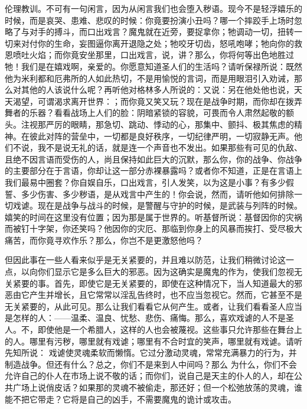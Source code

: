 伦理教训。不可有一句闲言，因为从闲言我们也会堕入秽语。现今不是轻浮嬉乐的时候，而是哀哭、患难、悲叹的时候：你竟要扮演小丑吗？哪一个摔跤手上场时忽略了与对手的搏斗，而口出戏言？魔鬼就在近旁，要捉拿你；牠调动一切，扭转一切来对付你的生命，妄图逼你离开退隐之处；牠咬牙切齿，怒吼咆哮；牠向你的救恩喷吐火焰；而你竟安坐那里，口出戏言，说，讲？那么，你将何等出色地胜过牠！我们是在嬉戏啊，亲爱的。你愿意知道圣人们的生活吗？请听保禄所说：既然他为米利都和厄弗所的人如此热切，不是用愉悦的言词，而是用眼泪引入劝诫，那么对其他的人该说什么呢？再听他对格林多人所说的：又说：另在他处他也说，天天渴望，可谓渴求离开世界：；而你竟又笑又玩？现在是战争时期，而你却在拨弄舞者的乐器？看看战场上人们的脸：阴暗紧锁的容貌，可畏而令人肃然起敬的额头。注视那严厉的眼睛，那急切、跳动、悸动的心，那集中、颤抖、极其焦虑的精神。在彼此对阵的营垒中，一切都是良好秩序，一切纪律严明，一切寂静无声。他们不说，我不是说无礼的话，就是连一个声音也不发出。如果那些有可见的仇敌、且绝不因言语而受伤的人，尚且保持如此巨大的沉默，那么你，你的战争、你战争的主要部分在于言语，你却让这一部分赤裸暴露吗？或者你不知道，正是在言语上我们最易中圈套？你自娱自乐，口出戏言，引人发笑，以为这是小事？有多少假誓、多少伤害、多少秽语，是从戏言中产生的！你会说，然而，请听他如何排除一切戏谑。现在是战争与战斗的时候，是警醒与守护的时候，是武装与列阵的时候。嬉笑的时间在这里没有位置；因为那是属于世界的。听基督所说：基督因你的灾祸而被钉十字架，你还笑吗？他因你的灾厄、那临到你身上的风暴而挨打、受尽极大痛苦，而你竟寻欢作乐？那么，你岂不是更激怒他吗？\par

但因此事在一些人看来似乎是无关紧要的，并且难以防范，让我们稍微讨论这一点，以向你们显示它是多么巨大的邪恶。因为这确实是魔鬼的作为，使我们忽视无关紧要的事。首先，即使它是无关紧要的，即使在这种情况下，当人知道最大的邪恶由它产生并增长，且它常常以淫乱告终时，也不应当忽视它。然而，它甚至不是无关紧要的，从此可见。那么让我们看看它从何产生。或者，让我们看看圣人应当是怎样的人：——温柔、温良、忧愁、悲伤、痛悔。那么，喜欢戏谑的人不是圣人。不，即使他是一个希腊人，这样的人也会被蔑视。这些事只允许那些在舞台上的人。哪里有污秽，哪里就有戏谑；哪里有不合时宜的笑声，哪里就有戏谑。请听先知所说：  戏谑使灵魂柔软而懒惰。它过分激动灵魂，常常充满暴力的行为，并制造战争。但还有什么？总之，你们不是来到人中间吗？那么  为什么，你们不会允许自己的仆人在市场上说不敬的话；而你们，说自己是天主的仆人的人，却在公共广场上说俏皮话？如果那的灵魂不被偷走，那还好；但一个松弛放荡的灵魂，谁能不把它带走？它将是自己的凶手，不需要魔鬼的诡计或攻击。\par

